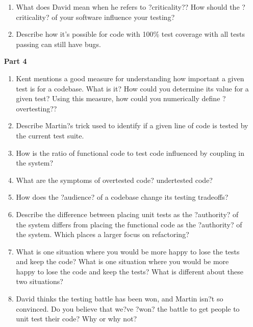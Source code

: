 \begin{enumerate}
\begin{enumerate}
			\item What does David mean when he refers to ?criticality?? How should the ?criticality? of your software influence your testing?


			\item Describe how it's possible for code with 100\% test coverage with all tests passing can still have bugs.


		\end{enumerate}
		
	\item[\bf{Part 4}]
		
		\begin{enumerate}
			\item Kent mentions a good measure for understanding how important a given test is for a codebase. What is it? How could you determine its value for a given test? Using this measure, how could you numerically define ?overtesting??


			\item Describe Martin?s trick used to identify if a given line of code is tested by the current test suite.


			\item How is the ratio of functional code to test code influenced by coupling in the system?


			\item What are the symptoms of overtested code? undertested code?


			\item How does the ?audience? of a codebase change its testing tradeoffs?


			\item Describe the difference between placing unit tests as the ?authority? of the system differs from placing the functional code as the ?authority? of the system. Which places a larger focus on refactoring?


			\item What is one situation where you would be more happy to lose the tests and keep the code? What is one situation where you would be more happy to lose the code and keep the tests? What is different about these two situations?


			\item David thinks the testing battle has been won, and Martin isn?t so convinced. Do you believe that we?ve ?won? the battle to get people to unit test their code? Why or why not?


		\end{enumerate}

\end{enumerate}



